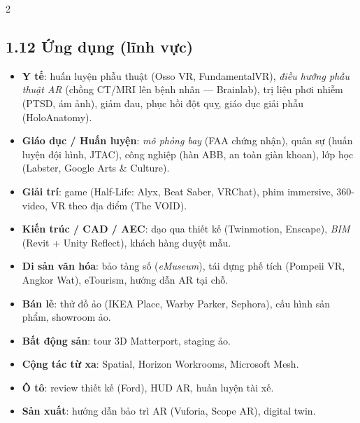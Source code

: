 \begin{paracol}{2}
\subsection*{1.12 Ứng dụng (lĩnh vực)}
\begin{itemize}[leftmargin=*,nosep]
  \item \textbf{Y tế}: huấn luyện phẫu thuật (Osso VR, FundamentalVR), \emph{điều hướng phẫu thuật AR} (chồng CT/MRI lên bệnh nhân — Brainlab), trị liệu phơi nhiễm (PTSD, ám ảnh), giảm đau, phục hồi đột quỵ, giáo dục giải phẫu (HoloAnatomy).
  \item \textbf{Giáo dục / Huấn luyện}: \emph{mô phỏng bay} (FAA chứng nhận), quân sự (huấn luyện đội hình, JTAC), công nghiệp (hàn ABB, an toàn giàn khoan), lớp học (Labster, Google Arts \& Culture).
  \item \textbf{Giải trí}: game (Half-Life: Alyx, Beat Saber, VRChat), phim immersive, 360-video, VR theo địa điểm (The VOID).
  \item \textbf{Kiến trúc / CAD / AEC}: dạo qua thiết kế (Twinmotion, Enscape), \emph{BIM} (Revit + Unity Reflect), khách hàng duyệt mẫu.
  \item \textbf{Di sản văn hóa}: bảo tàng số (\emph{eMuseum}), tái dựng phế tích (Pompeii VR, Angkor Wat), eTourism, hướng dẫn AR tại chỗ.
  \item \textbf{Bán lẻ}: thử đồ ảo (IKEA Place, Warby Parker, Sephora), cấu hình sản phẩm, showroom ảo.
  \item \textbf{Bất động sản}: tour 3D Matterport, staging ảo.
  \item \textbf{Cộng tác từ xa}: Spatial, Horizon Workrooms, Microsoft Mesh.
  \item \textbf{Ô tô}: review thiết kế (Ford), HUD AR, huấn luyện tài xế.
  \item \textbf{Sản xuất}: hướng dẫn bảo trì AR (Vuforia, Scope AR), digital twin.
\end{itemize}

\switchcolumn*


\end{paracol}
